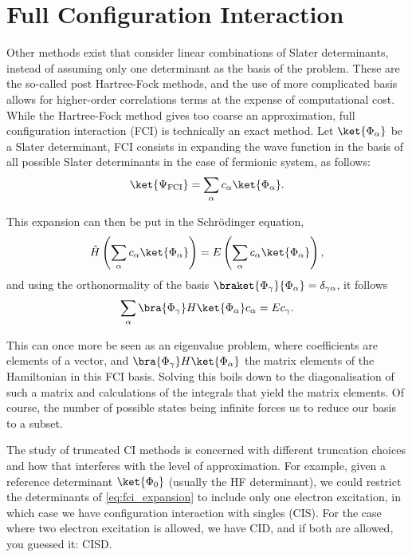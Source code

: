 \section{Full Configuration Interaction}
Other methods exist that consider linear combinations of Slater determinants, instead of assuming only one determinant as the basis of the problem. These are the so-called post Hartree-Fock methods, and the use of more complicated basis allows for higher-order correlations terms at the expense of computational cost. While the Hartree-Fock method gives too coarse an approximation, full configuration interaction (FCI) is technically an exact method.
Let $\ket{\Phi_{\alpha}}$ be a Slater determinant, FCI consists in expanding the wave function in the basis of all possible Slater determinants in the case of fermionic system, as follows:
\begin{align}
    \ket{\Psi_{\text{FCI}}} = \sum_\alpha c_\alpha \ket{\Phi_{\alpha}}.
    \label{eq:fci_expansion}
\end{align}

This expansion can then be put in the Schrödinger equation,
\begin{align*}
    \Hat{H}\left(\sum_\alpha c_\alpha \ket{\Phi_{\alpha}}\right) = E\left(\sum_\alpha c_\alpha \ket{\Phi_{\alpha}}\right),
\end{align*}
and using the orthonormality of the basis $\braket{\Phi_{\gamma}}{\Phi_{\alpha}}=\delta_{\gamma\alpha}$, it follows
\begin{align*}    
    \sum_\alpha \bra{\Phi_{\gamma}} H \ket{\Phi_{\alpha}} c_\alpha = Ec_\gamma.
\end{align*}

This can once more be seen as an eigenvalue problem, where coefficients are elements of a vector, and $\bra{\Phi_{\gamma}} H \ket{\Phi_{\alpha}}$ the matrix elements of the Hamiltonian in this FCI basis. Solving this boils down to the diagonalisation of such a matrix and calculations of the integrals that yield the matrix elements. Of course, the number of possible states being infinite forces us to reduce our basis to a subset.

The study of truncated CI methods is concerned with different truncation choices and how that interferes with the level of approximation. For example, given a reference determinant $\ket{\Phi_0}$ (usually the HF determinant), we could restrict the determinants of \eqref{eq:fci_expansion} to include only one electron excitation, in which case we have configuration interaction with singles (CIS). For the case where two electron excitation is allowed, we have CID, and if both are allowed, you guessed it: CISD.


